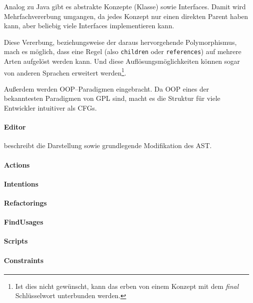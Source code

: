 Analog zu Java gibt es abstrakte Konzepte (Klasse) sowie Interfaces.
Damit wird Mehrfachvererbung umgangen, da jedes Konzept nur einen direkten Parent haben kann, aber beliebig viele Interfaces implementieren kann.

Diese Vererbung, beziehungsweise der daraus hervorgehende Polymorphismus, mach es möglich, dass eine Regel (also \verb|children| oder \verb|references|) auf mehrere Arten aufgelöst werden kann.
Und diese Auflösungsmöglichkeiten können sogar von anderen Sprachen erweitert werden\footnote{Ist dies nicht gewünscht, kann das erben von einem Konzept mit dem \textit{final} Schlüsselwort unterbunden werden.}.

Außerdem werden \acs{OOP}--Paradigmen eingebracht.
Da \ac{OOP} eines der bekanntesten Paradigmen von \ac{GPL} sind, macht es die Struktur für viele Entwickler intuitiver als \acp{CFG}.

\paragraph{Editor} beschreibt die Darstellung sowie grundlegende Modifikation des \ac{AST}.
\lipsum[5]

\paragraph{Actions}
\lipsum[5]

\paragraph{Intentions}
\lipsum[5]

\paragraph{Refactorings}
\lipsum[5]

\paragraph{FindUsages}
\lipsum[5]

\paragraph{Scripts}
\lipsum[5]

\paragraph{Constraints}
\lipsum[5]


